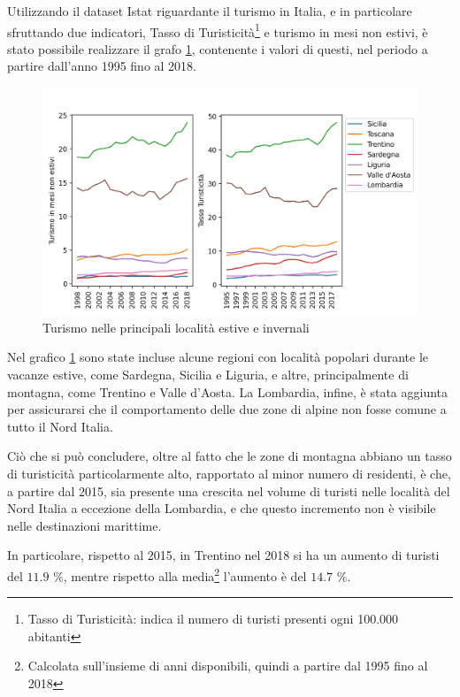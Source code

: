 \documentclass[a4paper,12pt]{report}
\begin{document}
Utilizzando il dataset Istat riguardante il turismo in Italia, e in 
particolare sfruttando due indicatori, Tasso di 
Turisticità\footnote{Tasso di Turisticità: indica il numero di turisti 
presenti ogni 100.000 abitanti\cite{ONTIT:1}} 
e turismo in mesi non estivi, è stato possibile realizzare il grafo \ref{fig:turismo}, 
contenente i valori di questi, nel periodo a partire dall'anno 1995 fino al 2018. 

\begin{figure}
    \includegraphics[width=\linewidth]{../src/turismo/turismo.png}
    \caption{Turismo nelle principali località estive e invernali}
    \label{fig:turismo}
\end{figure}

Nel grafico \ref{fig:turismo} sono state incluse alcune regioni con località popolari 
durante le vacanze estive, come Sardegna, Sicilia e Liguria, e altre, principalmente 
di montagna, come Trentino e Valle d'Aosta. 
La Lombardia, infine, è stata aggiunta per assicurarsi che il comportamento delle due zone 
di alpine non fosse comune a tutto il Nord Italia. 

Ciò che si può concludere, oltre al fatto che le zone di montagna abbiano 
un tasso di turisticità particolarmente alto, rapportato al minor numero di residenti,
è che, a partire dal 2015, sia presente una crescita nel volume di turisti nelle località 
del Nord Italia a eccezione della Lombardia, e che questo incremento non è visibile nelle 
destinazioni marittime. 

In particolare, rispetto al 2015, in Trentino nel 2018 si ha un aumento 
di turisti del $11.9$ \%, mentre rispetto alla 
media\footnote{Calcolata sull'insieme di anni disponibili, quindi 
a partire dal 1995 fino al 2018} l'aumento è del $14.7$ \%. 
\end{document}
